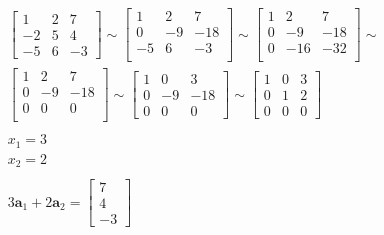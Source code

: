 \documentclass[12pt letter]{report}
\begin{document}
{{\begin{align*}
      \\
      \begin{bmatrix}
        1  & 2 & 7  \\
        -2 & 5 & 4  \\
        -5 & 6 & -3
      \end{bmatrix} \sim
      \begin{bmatrix}
        1  & 2  & 7   \\
        0  & -9 & -18 \\
        -5 & 6  & -3  \\
      \end{bmatrix} \sim
      \begin{bmatrix}
        1 & 2   & 7   \\
        0 & -9  & -18 \\
        0 & -16 & -32 \\
      \end{bmatrix} \sim
      \\
      \begin{bmatrix}
        1 & 2  & 7   \\
        0 & -9 & -18 \\
        0 & 0  & 0   \\
      \end{bmatrix} \sim
      \begin{bmatrix}
        1 & 0  & 3   \\
        0 & -9 & -18 \\
        0 & 0  & 0
      \end{bmatrix} \sim
      \begin{bmatrix}
        1 & 0 & 3 \\
        0 & 1 & 2 \\
        0 & 0 & 0
      \end{bmatrix}                                                                                                                         \\
      \\
      x_1 = 3                                                                                                                                \\
      x_2 = 2                                                                                                                                \\
      \\
      3 \mathbf{a}_1 + 2 \mathbf{a}_2 = \begin{bmatrix} 7 \\ 4 \\ -3 \end{bmatrix}
    \end{align*}
  }
}
\end{document}
